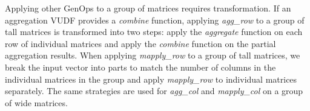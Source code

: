 Applying other GenOps to a group of matrices requires transformation. If an aggregation
VUDF provides a \textit{combine} function, applying \textit{agg\_row} to a group of
tall matrices is transformed into two steps: apply the \textit{aggregate} function on
each row of individual matrices and apply the \textit{combine} function on the partial
aggregation results. When applying \textit{mapply\_row} to a group of tall matrices,
we break the input vector into parts to match the number of columns in the individual
matrices in the group and apply \textit{mapply\_row} to individual matrices
separately. The same strategies are used for \textit{agg\_col} and
\textit{mapply\_col} on a group of wide matrices. 


